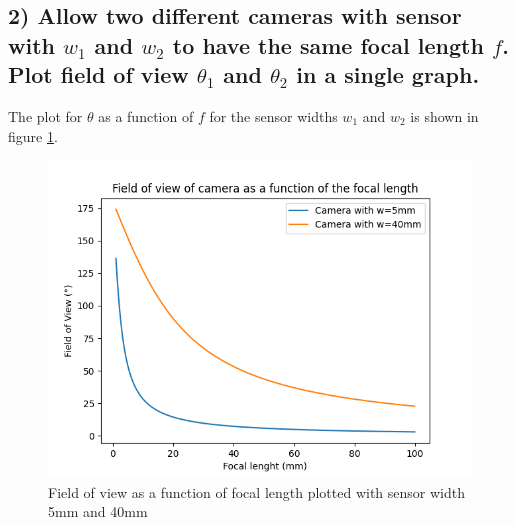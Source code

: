 \documentclass{article}
\begin{document}
    \subsection*{2)  Allow two different cameras with sensor with $w_1$ and $w_2$ to have the same focal length $f$. Plot field of view $\theta_1$ and $\theta_2$ in a single graph.}
    The plot for $\theta$ as a function of $f$ for the sensor widths $w_1$ and $w_2$ is shown in figure \ref{fig:plot}.
    \begin{figure}[H]
        \centering
        \includegraphics[width=1\textwidth]{Q2.png}
        \caption{Field of view as a function of focal length plotted with sensor width 5mm and 40mm}
        \label{fig:plot}
    \end{figure}
\end{document}
